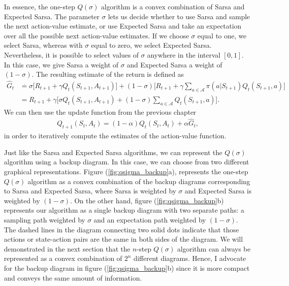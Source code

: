 In essence, the one-step $Q(\sigma)$ algorithm is a convex combination of Sarsa and Expected Sarsa.
The parameter $\sigma$ lets us decide whether to use Sarsa and sample the next action-value estimate, or use Expected Sarsa and take an expectation over all the possible next action-value estimates.
If we choose $\sigma$ equal to one, we select Sarsa, whereas with $\sigma$ equal to zero, we select Expected Sarsa. 
Nevertheless, it is possible to select values of $\sigma$ anywhere in the interval $[0,1]$.
In this case, we give Sarsa a weight of $\sigma$ and Expected Sarsa a weight of $(1-\sigma)$.
The resulting estimate of the return is defined as
%
\begin{align}
\label{eq:1step_qsigma_return}
\hat{G}_t &\overset{.}{=} \sigma \big[ R_{t+1} + \gamma Q_t(S_{t+1}, A_{t+1}) \big] 
	+ (1-\sigma) \big[ R_{t+1} + \gamma \sum_{a \in \mathcal{A}} \pi(a|S_{t+1}) Q_t(S_{t+1}, a) 
    \big] \nonumber \\
%
&= R_{t+1} + \gamma \big[ \sigma Q_t(S_{t+1}, A_{t+1}) + (1-\sigma) \sum_{a \in \mathcal{A}} Q_t(S_{t+1}, a) \big].
\end{align}
%
We can then use the update function from the previous chapter
%
\begin{align}
\label{eq:av_update}
Q_{t+1}(S_t,A_t) = (1-\alpha) Q_t(S_t, A_t) + \alpha \hat{G}_{t},
\end{align}
%
in order to iteratively compute the estimates of the action-value function.

Just like the Sarsa and Expected Sarsa algorithms, we can represent the $Q(\sigma)$ algorithm using a backup diagram.
In this case, we can choose from two different graphical representations. 
Figure (\ref{fig:qsigma_backup}a), represents the one-step $Q(\sigma)$ algorithm as a convex combination of the backup diagrams corresponding to Sarsa and Expected Sarsa, where Sarsa is weighted by $\sigma$ and Expected Sarsa is weighted by $(1-\sigma)$.
On the other hand, figure (\ref{fig:qsigma_backup}b) represents our algorithm as a single backup diagram with two separate paths: a sampling path weighted by $\sigma$ and an expectation path weighted by $(1-\sigma)$. 
The dashed lines in the diagram connecting two solid dots indicate that those actions or state-action pairs are the same in both sides of the diagram.
We will demonstrated in the next section that the $n$-step $Q(\sigma)$ algorithm can always be represented as a convex combination of $2^n$ different diagrams.
Hence, I advocate for the backup diagram in figure (\ref{fig:qsigma_backup}b) since it is more compact and conveys the same amount of information.

